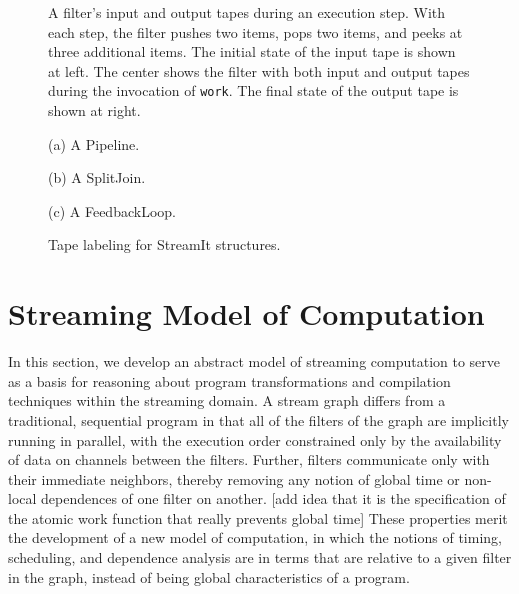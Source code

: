 \begin{figure}
\centering
{}
\caption{A filter's input and output tapes during an execution step.
With each step, the filter pushes two items, pops two items, and peeks
at three additional items.  The initial state of the input tape is
shown at left.  The center shows the filter with both input and output
tapes during the invocation of {\tt work}.  The final state of the
output tape is shown at right.}
\label{fig:tapes}
\end{figure}

\begin{figure}
\centering
{}

(a) A Pipeline. \\
\vspace{8pt}

(b) A SplitJoin. \\
\vspace{8pt}

(c) A FeedbackLoop. \\
\vspace{8pt}
\caption{Tape labeling for StreamIt structures.}
\label{fig:tapelabels}
\end{figure}

\section{Streaming Model of Computation}

In this section, we develop an abstract model of streaming computation
to serve as a basis for reasoning about program transformations and
compilation techniques within the streaming domain.  A stream graph
differs from a traditional, sequential program in that all of the
filters of the graph are implicitly running in parallel, with the
execution order constrained only by the availability of data on
channels between the filters.  Further, filters communicate only with
their immediate neighbors, thereby removing any notion of global time
or non-local dependences of one filter on another.  [add idea that it
is the specification of the atomic work function that really prevents
global time] These properties merit the development of a new model of
computation, in which the notions of timing, scheduling, and
dependence analysis are in terms that are relative to a given filter
in the graph, instead of being global characteristics of a program.

